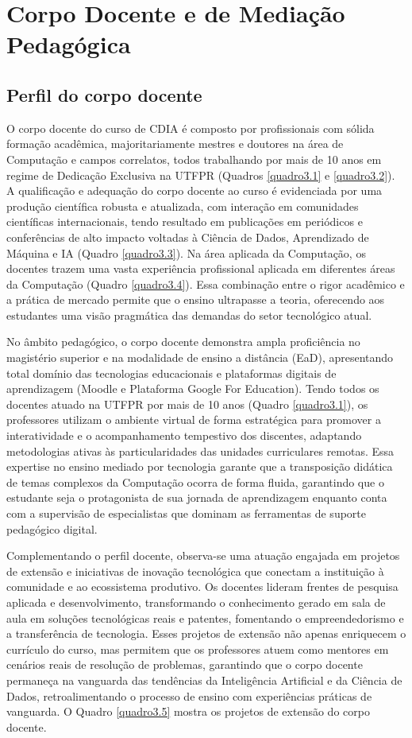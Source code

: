 \chapter{Corpo Docente e de Mediação Pedagógica}

\section{Perfil do corpo docente}

O corpo docente do curso de CDIA é composto por profissionais com sólida formação acadêmica, majoritariamente mestres e doutores na área de Computação e campos correlatos, todos trabalhando por mais de 10 anos em regime de Dedicação Exclusiva na UTFPR (Quadros \ref{quadro3.1} e \ref{quadro3.2}). A qualificação e adequação do corpo docente ao curso é evidenciada por uma produção científica robusta e atualizada, com interação em comunidades científicas internacionais, tendo resultado em publicações em periódicos e conferências de alto impacto voltadas à Ciência de Dados, Aprendizado de Máquina e IA (Quadro \ref{quadro3.3}). Na área aplicada da Computação, os docentes trazem uma vasta experiência profissional aplicada em diferentes áreas da Computação (Quadro \ref{quadro3.4}). Essa combinação entre o rigor acadêmico e a prática de mercado permite que o ensino ultrapasse a teoria, oferecendo aos estudantes uma visão pragmática das demandas do setor tecnológico atual.

No âmbito pedagógico, o corpo docente demonstra ampla proficiência no magistério superior e na modalidade de ensino a distância (EaD), apresentando total domínio das tecnologias educacionais e plataformas digitais de aprendizagem (Moodle e Plataforma Google For Education). Tendo todos os docentes atuado na UTFPR por mais de 10 anos (Quadro \ref{quadro3.1}), os professores utilizam o ambiente virtual de forma estratégica para promover a interatividade e o acompanhamento tempestivo dos discentes, adaptando metodologias ativas às particularidades das unidades curriculares remotas. Essa expertise no ensino mediado por tecnologia garante que a transposição didática de temas complexos da Computação ocorra de forma fluida, garantindo que o estudante seja o protagonista de sua jornada de aprendizagem enquanto conta com a supervisão de especialistas que dominam as ferramentas de suporte pedagógico digital.

Complementando o perfil docente, observa-se uma atuação engajada em projetos de extensão e iniciativas de inovação tecnológica que conectam a instituição à comunidade e ao ecossistema produtivo. Os docentes lideram frentes de pesquisa aplicada e desenvolvimento, transformando o conhecimento gerado em sala de aula em soluções tecnológicas reais e patentes, fomentando o empreendedorismo e a transferência de tecnologia. Esses projetos de extensão não apenas enriquecem o currículo do curso, mas permitem que os professores atuem como mentores em cenários reais de resolução de problemas, garantindo que o corpo docente permaneça na vanguarda das tendências da Inteligência Artificial e da Ciência de Dados, retroalimentando o processo de ensino com experiências práticas de vanguarda. O Quadro \ref{quadro3.5} mostra os projetos de extensão do corpo docente.

